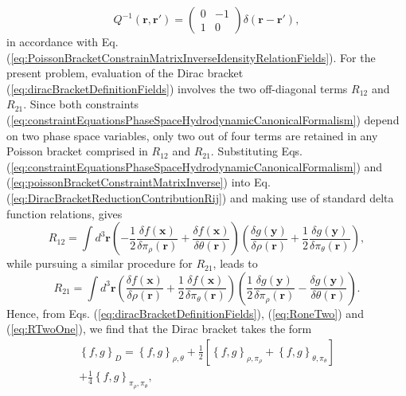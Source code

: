 \documentclass[twocolumn, nofootinbib, nobibnotes, amsmath,amssymb,aps, pra, floatfix]{revtex4-1}
\renewcommand{\v}[1]{\ensuremath{\mathbf{#1}}} %
\begin{document}
\begin{equation}
  Q^{-1}\left( \v{r},\v{r}' \right)=
  \begin{pmatrix}
   0&-1\\
   1&0
  \end{pmatrix}
  \delta\left( \v{r}-\v{r}' \right),
  \label{eq:poissonBracketConstraintMatrixInverse}
\end{equation}
in accordance with Eq. (\ref{eq:PoissonBracketConstrainMatrixInverseIdensityRelationFields}).
For the present problem, evaluation of the Dirac bracket (\ref{eq:diracBracketDefinitionFields}) involves the two off-diagonal terms $R_{12}$ and $R_{21}$.
Since both constraints (\ref{eq:constraintEquationsPhaseSpaceHydrodynamicCanonicalFormalism}) depend on two phase space variables, only two out of four terms are retained in any Poisson bracket comprised in $R_{12}$ and $R_{21}$.
Substituting Eqs. (\ref{eq:constraintEquationsPhaseSpaceHydrodynamicCanonicalFormalism}) and (\ref{eq:poissonBracketConstraintMatrixInverse}) into Eq. (\ref{eq:DiracBracketReductionContributionRij}) and making use of standard delta function relations, gives
\begin{equation}
  R_{12}=\int d^3\v{r}\left( -\frac{1}{2}\frac{\delta f\left( \v{x} \right)}{\delta\pi_{\rho}\left( \v{r} \right)}+\frac{\delta f\left( \v{x} \right)}{\delta\theta\left( \v{r} \right)} \right)\left( \frac{\delta g\left( \v{y} \right)}{\delta\rho\left( \v{r} \right)}+\frac{1}{2}\frac{\delta g\left( \v{y} \right)}{\delta\pi_{\theta}\left( \v{r} \right)} \right),
  \label{eq:RoneTwo}
\end{equation}
while pursuing a similar procedure for $R_{21}$, leads to 
\begin{equation}
  R_{21}=\int d^3\v{r}\left( \frac{\delta f\left( \v{x} \right)}{\delta\rho\left( \v{r} \right)}+\frac{1}{2}\frac{\delta f\left( \v{x} \right)}{\delta\pi_{\theta}\left( \v{r} \right)} \right)\left( \frac{1}{2}\frac{\delta g\left( \v{y} \right)}{\delta\pi_{\rho}\left( \v{r} \right)}-\frac{\delta g\left( \v{y} \right)}{\delta\theta\left( \v{r} \right)} \right).
  \label{eq:RTwoOne}
\end{equation}
Hence, from Eqs. (\ref{eq:diracBracketDefinitionFields}), (\ref{eq:RoneTwo}) and (\ref{eq:RTwoOne}), we find that the Dirac bracket takes the form
\begin{multline}
  \left\{ f,g \right\}_D=\left\{ f,g \right\}_{\rho,\theta}+\frac{1}{2}\left[ \left\{ f,g \right\}_{\rho,\pi_{\rho}}+\left\{ f,g \right\}_{\theta,\pi_{\theta}} \right]\\+\frac{1}{4}\left\{ f,g \right\}_{\pi_{\rho},\pi_{\theta}},
  \label{eq:diracBracketHydrodynamicalFieldFullPhaseSpace}
\end{multline}
\end{document}
